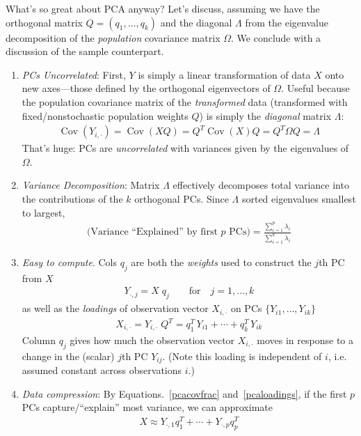 \documentclass[12pt]{article}
\numberwithin{equation}{section} %
\theoremstyle{plain}
\theoremstyle{definition}
\theoremstyle{remark}
\newcommand{\Cov}{\operatorname{Cov}}
\begin{document}
\clearpage
What's so great about PCA anyway?
Let's discuss, assuming we have the orthogonal matrix
$Q=(q_1,\ldots,q_k)$ and the diagonal $\Lambda$ from the eigenvalue
decomposition of the \emph{population} covariance matrix $\Omega$. We
conclude with a discussion of the sample counterpart.
\begin{enumerate}[label=(\roman*)]
  \item
    \emph{PCs Uncorrelated}:
    First, $Y$ is simply a linear transformation of data $X$ onto new
    axes---those defined by the orthogonal eigenvectors of $\Omega$.
    Useful because the population covariance matrix of the
    \emph{transformed} data (transformed with fixed/nonstochastic
    population weights $Q$) is simply the \emph{diagonal} matrix
    $\Lambda$:
    \begin{align}
      \Cov(Y_{i,\cdot}) = \Cov(XQ) = Q^T\Cov(X)Q=
      Q^T \Omega Q = \Lambda
      \label{pcacov}
    \end{align}
    That's huge: PCs are \emph{uncorrelated} with variances given by the
    eigenvalues of $\Omega$.

  \item \emph{Variance Decomposition}:
    Matrix $\Lambda$ effectively decomposes total variance into the
    contributions of the $k$ orthogonal PCs. Since $\Lambda$ sorted
    eigenvalues smallest to largest,
    \begin{align}
      \text{(Variance ``Explained'' by first $p$ PCs)}
      = \frac{\sum_{i=1}^p \lambda_i}{\sum_{i=1}^k\lambda_i}
      \label{pcacovfrac}
    \end{align}

  \item
    \emph{Easy to compute}.
    Cols $q_j$ are both the \emph{weights} used to construct the $j$th
    PC from $X$
    \begin{align*}
      Y_{\cdot,j} = X\;q_j
      \qquad \text{for}\quad j=1,\ldots,k
    \end{align*}
    as well as the \emph{loadings} of observation vector $X_{i,\cdot}$
    on PCs $\{Y_{i1},\ldots,Y_{ik}\}$
    \begin{align}
      X_{i,\cdot} = Y_{i,\cdot}\;Q^T
      = q_1^T \,Y_{i1} + \cdots + q_k^T \,Y_{ik}
      \label{pcaloadings}
    \end{align}
    Column $q_j$ gives how much the observation vector $X_{i,\cdot}$
    moves in response to a change in the (scalar) $j$th PC $Y_{ij}$.
    (Note this loading is independent of $i$, i.e. assumed constant
    across observations $i$.)

  \item
    \emph{Data compression}: By Equations.~\ref{pcacovfrac}
    and~\ref{pcaloadings}, if the first $p$ PCs capture/``explain'' most
    variance, we can approximate
    \begin{align}
      X \approx
      Y_{\cdot,1}q_1^T + \cdots + Y_{\cdot,p}q_p^T
    \end{align}
\end{enumerate}
\end{document}
